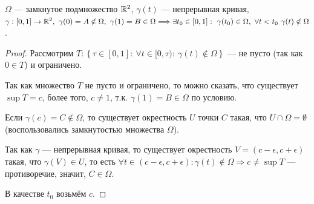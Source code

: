 \begin{lemma}
    $\Omega$ — замкнутое подмножество $\mathbb{R}^2$, $\gamma(t)$ — непрерывная кривая, $\gamma: [0,1] \to \R^2, \ \gamma(0) = A \notin \Omega, \ \gamma(1) = B \in \Omega \Longrightarrow \exists t_0 \in  [0,1]: \ \gamma(t_0) \in \Omega, \ \forall t < t_0 \ \gamma(t) \notin \Omega$.
\end{lemma}
\begin{proof}
    Рассмотрим $T: \left\{
        \tau \in [0,1]: \ \forall t \in [0, \tau): \ \gamma(t) \notin \Omega
    \right\}$ — не пусто (так как $0 \in T$) и ограничено.

    Так как множество $T$ не пусто и ограничено, то можно сказать, что существует $\sup{T} = c$, более того, $c \neq 1$, т.к. $\gamma(1) = B \in \Omega$ по условию.

    Если $\gamma(c) = C \notin \Omega$, то существует окрестность $U$ точки $C$ такая, что $U \cap \Omega = \emptyset$ (воспользовались замкнутостью множества $\Omega$).

    Так как $\gamma$ — непрерывная кривая, то существует окрестность $V = (c - \epsilon, c + \epsilon)$ такая, что $\gamma(V) \in U$, то есть $\forall t \in (c - \epsilon, c + \epsilon): \gamma(t) \notin \Omega \Longrightarrow c \neq \sup{T}$ — противоречие, значит, $C \in \Omega$.
    
    В качестве $t_0$ возьмём $c$.

\end{proof}


